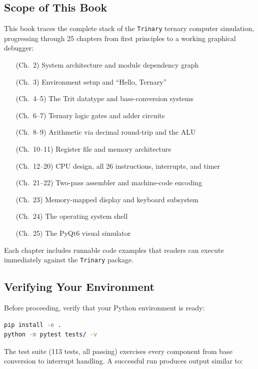 \documentclass[11pt,a4paper]{article}
\newcommand{\trinary}{\texttt{Trinary}}
\begin{document}
\subsection{Scope of This Book}

This book traces the complete stack of the \trinary{} ternary computer
simulation, progressing through 25 chapters from first principles to a
working graphical debugger:

\begin{enumerate}
  \item[(Ch.\ 2)] System architecture and module dependency graph
  \item[(Ch.\ 3)] Environment setup and ``Hello, Ternary''
  \item[(Ch.\ 4--5)] The Trit datatype and base-conversion systems
  \item[(Ch.\ 6--7)] Ternary logic gates and adder circuits
  \item[(Ch.\ 8--9)] Arithmetic via decimal round-trip and the ALU
  \item[(Ch.\ 10--11)] Register file and memory architecture
  \item[(Ch.\ 12--20)] CPU design, all 26 instructions, interrupts, and timer
  \item[(Ch.\ 21--22)] Two-pass assembler and machine-code encoding
  \item[(Ch.\ 23)] Memory-mapped display and keyboard subsystem
  \item[(Ch.\ 24)] The operating system shell
  \item[(Ch.\ 25)] The PyQt6 visual simulator
\end{enumerate}

Each chapter includes runnable code examples that readers can execute
immediately against the \trinary{} package.

\subsection{Verifying Your Environment}

Before proceeding, verify that your Python environment is ready:

\begin{lstlisting}[language=bash, caption={Installing \trinary{} and running
the test suite.}]
pip install -e .
python -m pytest tests/ -v
\end{lstlisting}

The test suite (113 tests, all passing) exercises every component from
base conversion to interrupt handling.  A successful run produces output
similar to:
\end{document}
